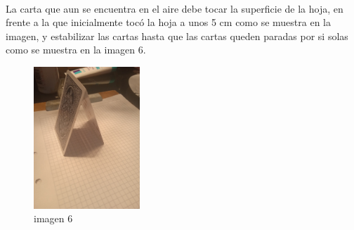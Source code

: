 \documentclass{article}
\begin{document}
\\
La carta que aun se encuentra en el aire debe tocar la superficie de la hoja, en frente a la que inicialmente tocó la hoja a unos 5 cm como se muestra en la imagen, y estabilizar las cartas hasta que las cartas queden paradas  por si solas como se muestra en la imagen 6.
\\
\begin{figure}[h]
\includegraphics[width=4cm]{imagen 6.png}
\centering
\caption{imagen 6}
\label{fig:cpplogo}
\end{figure}
\\
\end{document}
